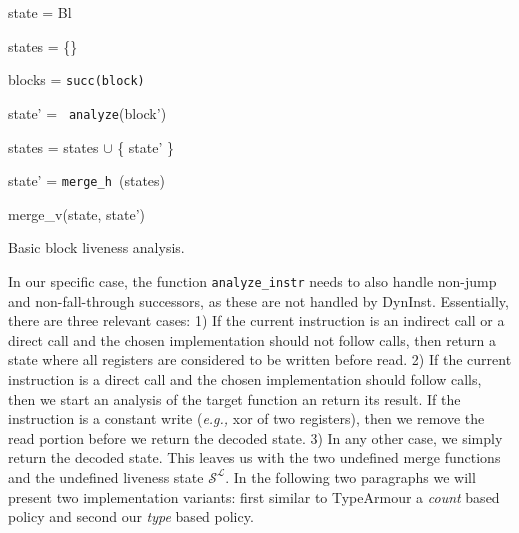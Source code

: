 \begin{algorithm}[h!]
 	\SetAlgoLined
        \BlankLine
	{
 	state = Bl                                                  
 	

	states = \{\}                                               
	
	blocks = \texttt{succ(block)}                                        
	
	 {
	
 		state' = \texttt{ analyze}(block') 
 		
		states = states $\cup$ \{ state' \} 
	}

	state' = \texttt{merge\_h }(states)	

	\Return merge\_v(state, state')                             

	}
\caption{Basic block liveness analysis.}
\label{alg:liveness}
\end{algorithm}

In our specific case, the function \texttt{analyze\_instr} needs to also handle non-jump and non-fall-through successors, as these are not handled by DynInst. 
Essentially, there are three relevant cases: 1) If the current instruction is an indirect call or a direct call and the chosen implementation should not follow calls, 
then return a state where all registers are considered to be written before read. 2) If the current instruction is a direct call and the chosen implementation should follow calls, 
then we start an analysis of the target function an return its result.
If the instruction is a constant write (\textit{e.g.,} xor of two registers), 
then we remove the read portion before we return the decoded state.
3) In any other case, we simply return the decoded state.
This leaves us with the two undefined merge functions and the undefined liveness state $\mathcal{S}^\mathcal{L}$. In the following two paragraphs we will present two 
implementation variants: first similar to TypeArmour a \emph{count} based policy and second our \emph{type} based policy.

